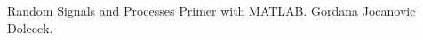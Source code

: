 \documentclass[10pt,a4paper]{article}
\begin{document}
\newpage








\begin{thebibliography}{99}
 Random Signals and Processes Primer with MATLAB. Gordana Jocanovic Dolecek.
\end{thebibliography}
\end{document}
